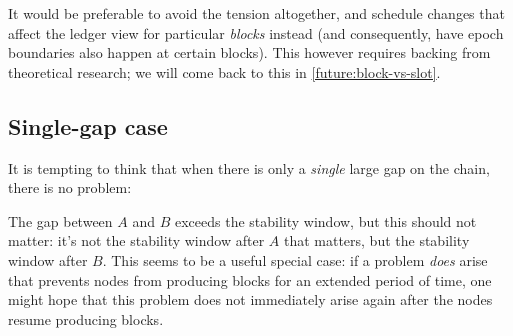 It would be preferable to avoid the tension altogether, and schedule
changes that affect the ledger view for particular \emph{blocks} instead
(and consequently, have epoch boundaries also happen at certain blocks). This
however requires backing from theoretical research; we will come back to this
in \cref{future:block-vs-slot}.

\pagebreak

\subsection{Single-gap case}

It is tempting to think that when there is only a \emph{single} large gap
on the chain, there is no problem:
%
\begin{center}
\end{center}
%
The gap between $A$ and $B$ exceeds the stability window, but this
should not matter: it's not the stability window after $A$ that
matters, but the stability window after $B$. This seems to be a useful special
case: if a problem \emph{does} arise that prevents nodes from producing blocks
for an extended period of time, one might hope that this problem does not
immediately arise again after the nodes resume producing blocks.


